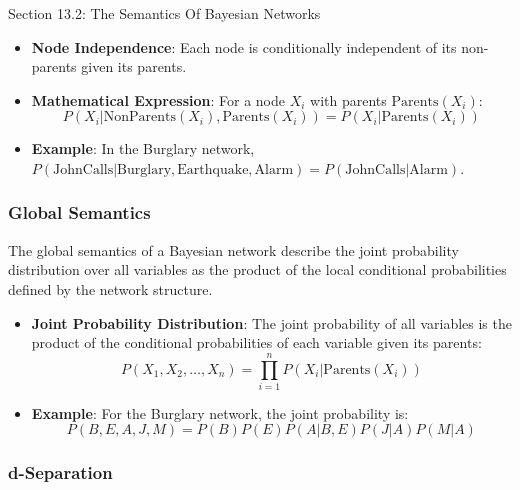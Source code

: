 \begin{notes}{Section 13.2: The Semantics Of Bayesian Networks}
    \begin{highlight}
    
        \begin{itemize}
            \item \textbf{Node Independence}: Each node is conditionally independent of its non-parents given its parents.
            \item \textbf{Mathematical Expression}: For a node $X_i$ with parents $\text{Parents}(X_i)$:
            \[
            P(X_i | \text{NonParents}(X_i), \text{Parents}(X_i)) = P(X_i | \text{Parents}(X_i))
            \]
            \item \textbf{Example}: In the Burglary network, $P(\text{JohnCalls} | \text{Burglary}, \text{Earthquake}, \text{Alarm}) = P(\text{JohnCalls} | \text{Alarm})$.
        \end{itemize}
    
    \end{highlight}
    
    \subsubsection*{Global Semantics}
    
    The global semantics of a Bayesian network describe the joint probability distribution over all variables as the product of the local conditional probabilities defined by the network structure.
    
    \begin{highlight}
    
        \begin{itemize}
            \item \textbf{Joint Probability Distribution}: The joint probability of all variables is the product of the conditional probabilities of each variable given its parents:
            \[
            P(X_1, X_2, \ldots, X_n) = \prod_{i=1}^n P(X_i | \text{Parents}(X_i))
            \]
            \item \textbf{Example}: For the Burglary network, the joint probability is:
            \[
            P(B, E, A, J, M) = P(B) P(E) P(A | B, E) P(J | A) P(M | A)
            \]
        \end{itemize}
    
    \end{highlight}
    
    \subsubsection*{d-Separation}
    

\end{notes}
